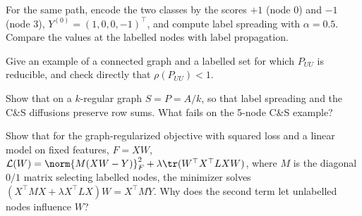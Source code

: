 \begin{notechapter}
\begin{exercise}\label{semi-supervised-graphs:exr:2}
For the same path, encode the two classes by the scores $+1$ (node $0$) and $-1$ (node $3$), $Y^{(0)} = (1, 0, 0, -1)^\top$, and compute label spreading with $\alpha = 0.5$. Compare the values at the labelled nodes with label propagation.
\end{exercise}

\begin{exercise}\label{semi-supervised-graphs:exr:3}
Give an example of a connected graph and a labelled set for which $P_{UU}$ is reducible, and check directly that $\rho(P_{UU}) < 1$.
\end{exercise}

\begin{exercise}\label{semi-supervised-graphs:exr:4}
Show that on a $k$-regular graph $S = P = A/k$, so that label spreading and the C\&S diffusions preserve row sums. What fails on the 5-node C\&S example?
\end{exercise}

\begin{exercise}\label{semi-supervised-graphs:exr:5}
Show that for the graph-regularized objective with squared loss and a linear model on fixed features, $F = XW$, $\mathcal L(W) = \norm{M(XW - Y)}_F^2 + \lambda\tr(W^\top X^\top LXW)$, where $M$ is the diagonal $0/1$ matrix selecting labelled nodes, the minimizer solves $(X^\top MX + \lambda X^\top LX)W = X^\top MY$. Why does the second term let unlabelled nodes influence $W$?
\end{exercise}

\end{notechapter}
